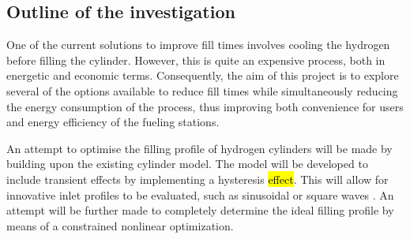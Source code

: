 \subsection{Outline of the investigation}
One of the current solutions to improve fill times involves cooling the hydrogen before filling the cylinder. However, this is quite an expensive process, both in energetic and economic terms. Consequently, the aim of this project is to explore several of the options available to reduce fill times while simultaneously reducing the energy consumption of the process, thus improving both convenience for users and energy efficiency of the fueling stations. 

An attempt to optimise the filling profile of hydrogen cylinders will be made by building upon the existing cylinder model. The model will be developed to include transient effects by implementing a hysteresis \hl{effect}. This will allow for innovative inlet profiles to be evaluated, such as sinusoidal or square waves . An attempt will be further made to completely determine the ideal filling profile by means of a constrained nonlinear optimization.











